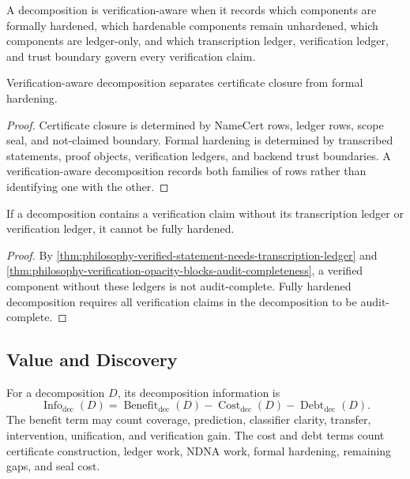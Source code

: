 \begin{definition}
\label{def:philosophy-verification-aware-decomposition}
A decomposition is verification-aware when it records which components
are formally hardened, which hardenable components remain unhardened,
which components are ledger-only, and which transcription ledger,
verification ledger, and trust boundary govern every verification
claim.
\end{definition}

\begin{theorem}
\label{thm:philosophy-closure-hardening-separate-axes}
Verification-aware decomposition separates certificate closure from
formal hardening.
\end{theorem}
\begin{proof}
Certificate closure is determined by NameCert rows, ledger rows, scope
seal, and not-claimed boundary. Formal hardening is determined by
transcribed statements, proof objects, verification ledgers, and backend
trust boundaries. A verification-aware decomposition records both
families of rows rather than identifying one with the other.
\end{proof}

\begin{theorem}
\label{thm:philosophy-verification-gaps-block-fully-hardened-decomposition}
If a decomposition contains a verification claim without its
transcription ledger or verification ledger, it cannot be fully
hardened.
\end{theorem}
\begin{proof}
By \autoref{thm:philosophy-verified-statement-needs-transcription-ledger}
and
\autoref{thm:philosophy-verification-opacity-blocks-audit-completeness},
a verified component without these ledgers is not audit-complete. Fully
hardened decomposition requires all verification claims in the
decomposition to be audit-complete.
\end{proof}

\subsection{Value and Discovery}
\label{subsec:philosophy-decomposition-value-discovery}

\begin{definition}
\label{def:philosophy-decomposition-information}
For a decomposition $D$, its decomposition information is
$$
\operatorname{Info}_{\mathrm{dec}}(D)
=
\operatorname{Benefit}_{\mathrm{dec}}(D)
-
\operatorname{Cost}_{\mathrm{dec}}(D)
-
\operatorname{Debt}_{\mathrm{dec}}(D).
$$
The benefit term may count coverage, prediction, classifier clarity,
transfer, intervention, unification, and verification gain. The cost and
debt terms count certificate construction, ledger work, NDNA work,
formal hardening, remaining gaps, and seal cost.
\end{definition}

